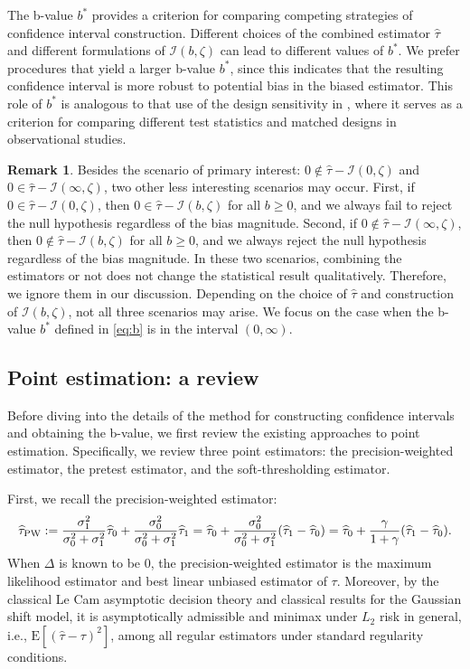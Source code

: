 \documentclass[11pt]{article}
\def\E{{\mathrm E}}
\def\cI{{\mathcal I}}
\newcommand{\htau}{\widehat\tau}
\numberwithin{equation}{section}
\theoremstyle{definition}
\newtheorem{remark}{Remark}[section]
\begin{document}
The b-value $b^*$ provides a criterion for comparing competing strategies of confidence interval construction. Different choices of the combined estimator $\hat\tau$ and different formulations of $\cI(b, \zeta)$ can lead to different values of $b^*$. We prefer procedures that yield a larger b-value $b^*$, since this indicates that the resulting confidence interval is more robust to potential bias in the biased estimator. This role of $b^*$ is analogous to that use of the design sensitivity in \cite{rosenbaum2004design}, where it serves as a criterion for comparing different test statistics and matched designs in observational studies.

\begin{remark}
  Besides the scenario of primary interest: $0 \notin \hat\tau - \cI(0, \zeta)$ and $0 \in \hat\tau - \cI(\infty, \zeta)$, two other less interesting scenarios may occur. First, if $0 \in \hat\tau - \cI(0, \zeta)$, then $0 \in \hat\tau - \cI(b, \zeta)$ for all $b \ge 0$, and we always fail to reject the null hypothesis regardless of the bias magnitude. Second, if $0 \notin \hat\tau - \cI(\infty, \zeta)$, then $0 \notin \hat\tau - \cI(b, \zeta)$ for all $b \ge 0$, and we always reject the null hypothesis regardless of the bias magnitude. In these two scenarios, combining the estimators or not does not change the statistical result qualitatively. Therefore, we ignore them in our discussion. Depending on the choice of $\hat\tau$ and construction of $\cI(b, \zeta)$, not all three scenarios may arise. We focus on the case when the b-value $b^*$ defined in \eqref{eq:b} is in the interval $(0, \infty)$.
\end{remark}

\subsection{Point estimation: a review}\label{sec:point}

Before diving into the details of the method for constructing confidence intervals and obtaining the b-value, we first review the existing approaches to point estimation. Specifically, we review three point estimators: the precision-weighted estimator, the pretest estimator, and the soft-thresholding estimator.

First, we recall the precision-weighted estimator:
\[
\htau_{\rm PW} := \frac{\sigma_1^2}{\sigma_0^2 + \sigma_1^2} \htau_0 + \frac{\sigma_0^2}{\sigma_0^2 + \sigma_1^2} \htau_1 = \htau_0 + \frac{\sigma_0^2}{\sigma_0^2 + \sigma_1^2} (\htau_1 - \htau_0) = \htau_0 + \frac{\gamma}{1+\gamma} (\htau_1 - \htau_0).
\]
When $\Delta$ is known to be 0, the precision-weighted estimator is the maximum likelihood estimator and best linear unbiased estimator of $\tau$. Moreover, by the classical Le Cam asymptotic decision theory \citep{le1956asymptotic} and classical results for the Gaussian shift model, it is asymptotically admissible and minimax under $L_2$ risk in general, i.e., $\E[(\hat\tau - \tau)^2]$, among all regular estimators under standard regularity conditions.
\end{document}
